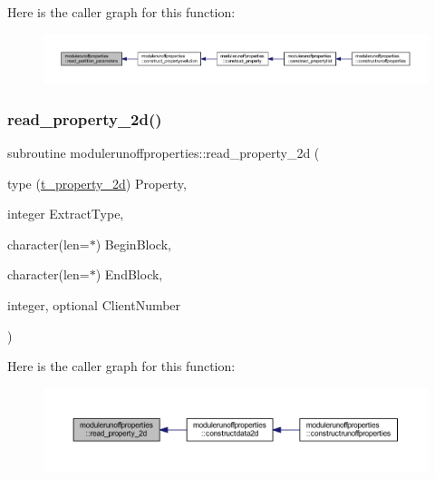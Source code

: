 Here is the caller graph for this function\+:\nopagebreak
\begin{figure}[H]
\begin{center}
\leavevmode
\includegraphics[width=350pt]{namespacemodulerunoffproperties_ab3fc52402148877652dc3cb453fd27be_icgraph}
\end{center}
\end{figure}
\mbox{\label{namespacemodulerunoffproperties_afc75586d1d0e2fe3793c44849c61d34a}} 
\subsubsection{\texorpdfstring{read\+\_\+property\+\_\+2d()}{read\_property\_2d()}}
{\footnotesize\ttfamily subroutine modulerunoffproperties\+::read\+\_\+property\+\_\+2d (\begin{DoxyParamCaption}\item[{type (\mbox{\hyperlink{structmodulerunoffproperties_1_1t__property__2d}{t\+\_\+property\+\_\+2d}})}]{Property,  }\item[{integer}]{Extract\+Type,  }\item[{character(len=$\ast$)}]{Begin\+Block,  }\item[{character(len=$\ast$)}]{End\+Block,  }\item[{integer, optional}]{Client\+Number }\end{DoxyParamCaption})\hspace{0.3cm}{\ttfamily [private]}}

Here is the caller graph for this function\+:\nopagebreak
\begin{figure}[H]
\begin{center}
\leavevmode
\includegraphics[width=350pt]{namespacemodulerunoffproperties_afc75586d1d0e2fe3793c44849c61d34a_icgraph}
\end{center}
\end{figure}
\mbox{\label{namespacemodulerunoffproperties_ade7661d1679610044a3f568f06610532}} 
